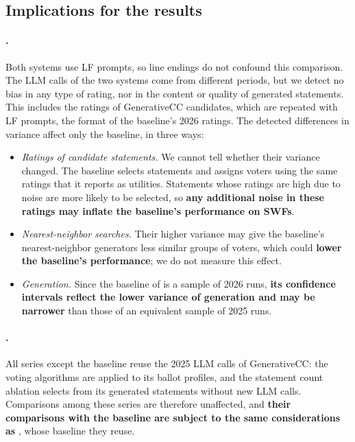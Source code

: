\documentclass[letterpaper]{article} %
\begin{document}
\subsection{Implications for the results}

\paragraph{.}
Both systems use LF prompts, so line endings do not confound this comparison.
The LLM calls of the two systems come from different periods, but we detect no bias in any type of rating, nor in the content or quality of generated statements.
This includes the ratings of GenerativeCC candidates, which are repeated with LF prompts, the format of the baseline's 2026 ratings.
The detected differences in variance affect only the baseline, in three ways:
\begin{itemize}
    \item \emph{Ratings of candidate statements.}
    We cannot tell whether their variance changed.
    The baseline selects statements and assigns voters using the same ratings that it reports as utilities.
    Statements whose ratings are high due to noise are more likely to be selected, so \textbf{any additional noise in these ratings may inflate the baseline's performance on SWFs}.
    \item \emph{Nearest-neighbor searches.}
    Their higher variance may give the baseline's nearest-neighbor generators less similar groups of voters, which could \textbf{lower the baseline's performance}; we do not measure this effect.
    \item \emph{Generation.}
    Since the baseline of  is a sample of 2026 runs, \textbf{its confidence intervals reflect the lower variance of generation and may be narrower} than those of an equivalent sample of 2025 runs.
\end{itemize}

\paragraph{.}
All series except the baseline reuse the 2025 LLM calls of GenerativeCC: the voting algorithms are applied to its ballot profiles, and the statement count ablation selects from its generated statements without new LLM calls.
Comparisons among these series are therefore unaffected, and \textbf{their comparisons with the baseline are subject to the same considerations as }, whose baseline they reuse.
\end{document}
